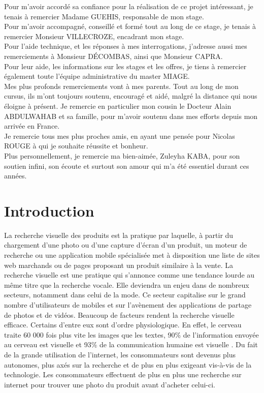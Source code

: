 \documentclass[a4paper, 12pt]{report}
\begin{document}
Pour m’avoir accordé sa confiance pour la réalisation de ce projet intéressant, je tenais à remercier Madame GUEHIS, responsable de mon stage.\\

Pour m’avoir accompagné, conseillé et formé tout au long de ce stage, je tenais à remercier Monsieur VILLECROZE, encadrant mon stage.\\

Pour l’aide technique, et les réponses à mes interrogations, j’adresse aussi mes remerciements à Monsieur DÉCOMBAS, ainsi que Monsieur CAPRA.\\

Pour leur aide, les informations sur les stages et les offres, je tiens à remercier également toute l'équipe administrative du master MIAGE. \\

Mes plus profonds remerciements vont à mes parents. Tout au long de mon cursus, ils m’ont toujours soutenu, encouragé et aidé, malgré la distance qui nous éloigne à présent. Je remercie en particulier mon cousin le Docteur Alain ABDULWAHAB et sa famille, pour m’avoir soutenu dans mes efforts depuis mon arrivée en France.  \\

Je remercie tous mes plus proches amis, en ayant une pensée pour Nicolas ROUGE à qui je souhaite réussite et bonheur. \\

Plus personnellement, je remercie ma bien-aimée, Zuleyha KABA, pour son soutien infini, son écoute et surtout son amour qui m’a été essentiel durant ces années. 


\chapter{Introduction}
La recherche visuelle des produits est la pratique par laquelle, à partir du chargement d’une photo ou d’une capture d’écran d’un produit, un moteur de recherche ou une application mobile spécialisée met à disposition une liste de sites web marchands ou de pages proposant un produit similaire à la vente. La recherche visuelle est une pratique qui s'annonce comme une tendance lourde au même titre que la recherche vocale.
Elle deviendra un enjeu dans de nombreux secteurs, notamment dans celui de la mode. Ce secteur capitalise sur le grand nombre d’utilisateurs de mobiles et sur l’avènement des applications de partage de photos et de vidéos. Beaucoup de facteurs rendent la recherche visuelle efficace. Certains d’entre eux sont d’ordre physiologique. En effet, le cerveau traite 60 000 fois plus vite les images que les textes, 90\% de l'information envoyée au cerveau est visuelle et 93\% de la communication humaine est visuelle \cite{0}. Du fait de la grande utilisation de l’internet, les consommateurs sont devenus plus autonomes, plus axés sur la recherche et de plus en plus exigeant vis-à-vis de la technologie. Les consommateurs effectuent de plus en plus une recherche sur internet pour trouver une photo du produit avant d'acheter celui-ci.\\
\end{document}
